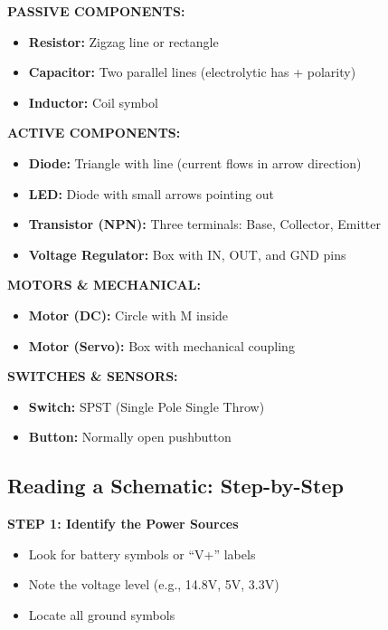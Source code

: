 \documentclass[11pt,letterpaper]{article}
\begin{document}
\textbf{PASSIVE COMPONENTS:}

\begin{itemize}
\item \textbf{Resistor:} Zigzag line or rectangle
\item \textbf{Capacitor:} Two parallel lines (electrolytic has + polarity)
\item \textbf{Inductor:} Coil symbol
\end{itemize}

\textbf{ACTIVE COMPONENTS:}

\begin{itemize}
\item \textbf{Diode:} Triangle with line (current flows in arrow direction)
\item \textbf{LED:} Diode with small arrows pointing out
\item \textbf{Transistor (NPN):} Three terminals: Base, Collector, Emitter
\item \textbf{Voltage Regulator:} Box with IN, OUT, and GND pins
\end{itemize}

\textbf{MOTORS \& MECHANICAL:}

\begin{itemize}
\item \textbf{Motor (DC):} Circle with M inside
\item \textbf{Motor (Servo):} Box with mechanical coupling
\end{itemize}

\textbf{SWITCHES \& SENSORS:}

\begin{itemize}
\item \textbf{Switch:} SPST (Single Pole Single Throw)
\item \textbf{Button:} Normally open pushbutton
\end{itemize}

\subsection{Reading a Schematic: Step-by-Step}

\textbf{STEP 1: Identify the Power Sources}
\begin{itemize}
\item Look for battery symbols or ``V+'' labels
\item Note the voltage level (e.g., 14.8V, 5V, 3.3V)
\item Locate all ground symbols
\end{itemize}
\end{document}
